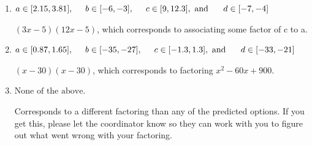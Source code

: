 \documentclass{extbook}[14pt]
\begin{document}
\begin{enumerate}
{\begin{enumerate}[label=\Alph*.]
 $(18x -5)(2x -5)$, which corresponds to associating some factor of a to c.
\item \( a \in [2.15, 3.81], \hspace*{5mm} b \in [-6, -3], \hspace*{5mm} c \in [9, 12.3], \text{ and } \hspace*{5mm} d \in [-7, -4] \)

 $(3x -5)(12x -5)$, which corresponds to associating some factor of c to a.
\item \( a \in [0.87, 1.65], \hspace*{5mm} b \in [-35, -27], \hspace*{5mm} c \in [-1.3, 1.3], \text{ and } \hspace*{5mm} d \in [-33, -21] \)

 $(x -30)(x -30)$, which corresponds to factoring $x^{2} -60 x + 900$.
\item \( \text{None of the above.} \)

 Corresponds to a different factoring than any of the predicted options. If you get this, please let the coordinator know so they can work with you to figure out what went wrong with your factoring.
\end{enumerate}

}
\end{enumerate}
\end{document}
